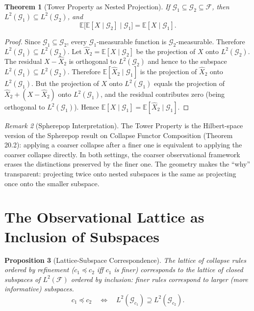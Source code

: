 \documentclass[12pt, a4paper, openany]{book}
\theoremstyle{plain}
\newtheorem{theorem}{Theorem}[chapter]
\newtheorem{proposition}[theorem]{Proposition}
\theoremstyle{definition}
\theoremstyle{remark}
\newtheorem{remark}[theorem]{Remark}
\begin{document}
\begin{theorem}[Tower Property as Nested Projection]
If $\mathcal{G}_1 \subseteq \mathcal{G}_2 \subseteq \mathcal{F}$, then
$L^2(\mathcal{G}_1) \subseteq L^2(\mathcal{G}_2)$, and
\[
\mathbb{E}\bigl[\mathbb{E}[X \mid \mathcal{G}_2] \mid \mathcal{G}_1\bigr]
= \mathbb{E}[X \mid \mathcal{G}_1].
\]
\end{theorem}

\begin{proof}
Since $\mathcal{G}_1 \subseteq \mathcal{G}_2$, every $\mathcal{G}_1$-measurable
function is $\mathcal{G}_2$-measurable. Therefore $L^2(\mathcal{G}_1) \subseteq
L^2(\mathcal{G}_2)$. Let $\hat{X}_2 = \mathbb{E}[X \mid \mathcal{G}_2]$ be
the projection of $X$ onto $L^2(\mathcal{G}_2)$. The residual
$X - \hat{X}_2$ is orthogonal to $L^2(\mathcal{G}_2)$ and hence to the subspace
$L^2(\mathcal{G}_1) \subseteq L^2(\mathcal{G}_2)$. Therefore
$\mathbb{E}[\hat{X}_2 \mid \mathcal{G}_1]$ is the projection of $\hat{X}_2$ onto
$L^2(\mathcal{G}_1)$. But the projection of $X$ onto $L^2(\mathcal{G}_1)$ equals
the projection of $\hat{X}_2 + (X - \hat{X}_2)$ onto $L^2(\mathcal{G}_1)$, and
the residual contributes zero (being orthogonal to $L^2(\mathcal{G}_1)$). Hence
$\mathbb{E}[X \mid \mathcal{G}_1] = \mathbb{E}[\hat{X}_2 \mid \mathcal{G}_1]$.
\end{proof}

\begin{remark}[Spherepop Interpretation]
The Tower Property is the Hilbert-space version of the Spherepop result on
Collapse Functor Composition (Theorem 20.2): applying a coarser collapse after
a finer one is equivalent to applying the coarser collapse directly. In both
settings, the coarser observational framework erases the distinctions preserved
by the finer one. The geometry makes the ``why'' transparent: projecting twice
onto nested subspaces is the same as projecting once onto the smaller subspace.
\end{remark}

\section{The Observational Lattice as Inclusion of Subspaces}

\begin{proposition}[Lattice-Subspace Correspondence]
The lattice of collapse rules ordered by refinement ($c_1 \preceq c_2$ iff
$c_1$ is finer) corresponds to the lattice of closed subspaces of $L^2(\mathcal{F})$
ordered by inclusion: finer rules correspond to larger (more informative)
subspaces.
\[
c_1 \preceq c_2 \quad \iff \quad L^2(\mathcal{G}_{c_1}) \supseteq L^2(\mathcal{G}_{c_2}).
\]
\end{proposition}
\end{document}

